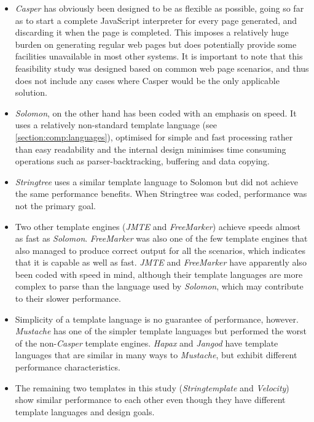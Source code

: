 \begin{itemize}

\item \emph{Casper} has obviously been designed to be as flexible as possible, going so far as to start a complete JavaScript interpreter for every page generated, and discarding it when the page is completed. This imposes a relatively huge burden on generating regular web pages but does potentially provide some facilities unavailable in most other systems. It is important to note that this feasibility study was designed based on common web page scenarios, and thus does not include any cases where Casper would be the only applicable solution.

\item \emph{Solomon}, on the other hand has been coded with an emphasis on speed. It uses a relatively non-standard \gls{template language} (see \autoref{section:comp:languages}), optimised for simple and fast processing rather than easy readability and the internal design minimises time consuming operations such as parser-backtracking, buffering and data copying.

\item \emph{Stringtree} uses a similar \gls{template language} to Solomon but did not achieve the same performance benefits. When Stringtree was coded, performance was not the primary goal.

\item Two other template engines (\emph{JMTE} and \emph{FreeMarker}) achieve speeds almost as fast as \emph{Solomon}. \emph{FreeMarker} was also one of the few template engines that also managed to produce correct output for all the scenarios, which indicates that it is capable as well as fast. \emph{JMTE} and \emph{FreeMarker} have apparently also been coded with speed in mind, although their \gls{template language}s are more complex to parse than the language used by \emph{Solomon}, which may contribute to their slower performance. 

\item Simplicity of a \gls{template language} is no guarantee of performance, however. \emph{Mustache} has one of the simpler \gls{template language}s but performed the worst of the non-\emph{Casper} template engines. \emph{Hapax} and \emph{Jangod} have \gls{template language}s that are similar in many ways to \emph{Mustache}, but exhibit different performance characteristics. 

\item The remaining two templates in this study (\emph{Stringtemplate} and \emph{Velocity}) show similar performance to each other even though they have different \gls{template language}s and design goals.

\end{itemize}

